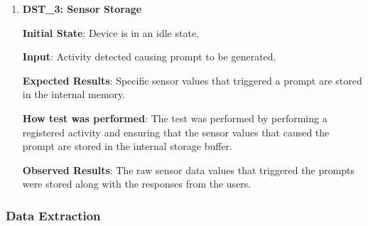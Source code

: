 \documentclass[12pt, titlepage]{article}
\begin{document}
\begin{enumerate}
  \item{\textbf{DST\_3: Sensor Storage} \\}\label{DST3}

  \textbf{Initial State}: Device is in an idle state.

  \textbf{Input}: Activity detected causing prompt to be generated.

  \textbf{Expected Results}: Specific sensor values that triggered a prompt are stored in the internal memory.

  \textbf{How test was performed}: The test was performed by performing a registered activity and ensuring that the sensor values that caused the prompt are stored in the internal storage buffer.

  \textbf{Observed Results}: The raw sensor data values that triggered the prompts were stored along with the responses from the users.\\
\end{enumerate}
\subsubsection{Data Extraction}
\end{document}
